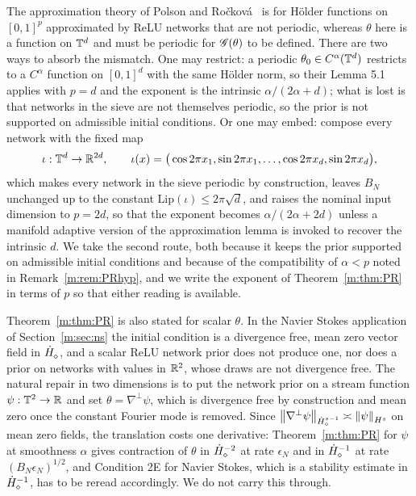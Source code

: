\begin{remark}\label{m:rem:PRdomain}
The approximation theory of Polson and Ro\v{c}kov\'a~\cite{polsonrockova2018} is for H\"older functions on $[0,1]^p$ approximated by ReLU networks that are not periodic, whereas $\theta$ here is a function on $\mathbb{T}^d$ and must be periodic for $\mathscr{G}(\theta)$ to be defined. There are two ways to absorb the mismatch. One may restrict: a periodic $\theta_0\in C^\alpha(\mathbb{T}^d)$ restricts to a $C^\alpha$ function on $[0,1]^d$ with the same H\"older norm, so their Lemma 5.1 applies with $p=d$ and the exponent is the intrinsic $\alpha/(2\alpha+d)$; what is lost is that networks in the sieve are not themselves periodic, so the prior is not supported on admissible initial conditions. Or one may embed: compose every network with the fixed map
\[
\iota:\mathbb{T}^d\to\mathbb{R}^{2d},\qquad\iota(x)=\big(\cos2\pi x_1,\sin2\pi x_1,\dots,\cos2\pi x_d,\sin2\pi x_d\big),
\]
which makes every network in the sieve periodic by construction, leaves $B_N$ unchanged up to the constant $\mathrm{Lip}(\iota)\le2\pi\sqrt d$, and raises the nominal input dimension to $p=2d$, so that the exponent becomes $\alpha/(2\alpha+2d)$ unless a manifold adaptive version of the approximation lemma is invoked to recover the intrinsic $d$. We take the second route, both because it keeps the prior supported on admissible initial conditions and because of the compatibility of $\alpha<p$ noted in Remark~\ref{m:rem:PRhyp}, and we write the exponent of Theorem~\ref{m:thm:PR} in terms of $p$ so that either reading is available.

Theorem~\ref{m:thm:PR} is also stated for scalar $\theta$. In the Navier Stokes application of Section~\ref{m:sec:ns} the initial condition is a divergence free, mean zero vector field in $\dot H^{}_\diamond$, and a scalar ReLU network prior does not produce one, nor does a prior on networks with values in $\mathbb{R}^2$, whose draws are not divergence free. The natural repair in two dimensions is to put the network prior on a stream function $\psi:\mathbb{T}^2\to\mathbb{R}$ and set $\theta=\nabla^\perp\psi$, which is divergence free by construction and mean zero once the constant Fourier mode is removed. Since $\left\|\nabla^\perp\psi\right\|_{\dot H^{s-1}_\diamond}\asymp\left\|\psi\right\|_{H^s}$ on mean zero fields, the translation costs one derivative: Theorem~\ref{m:thm:PR} for $\psi$ at smoothness $\alpha$ gives contraction of $\theta$ in $\dot H^{-2}_\diamond$ at rate $\epsilon_N$ and in $\dot H^{-1}_\diamond$ at rate $(B_N\epsilon_N)^{1/2}$, and Condition 2E for Navier Stokes, which is a stability estimate in $\dot H^{-1}_\diamond$, has to be reread accordingly. We do not carry this through.
\end{remark}

